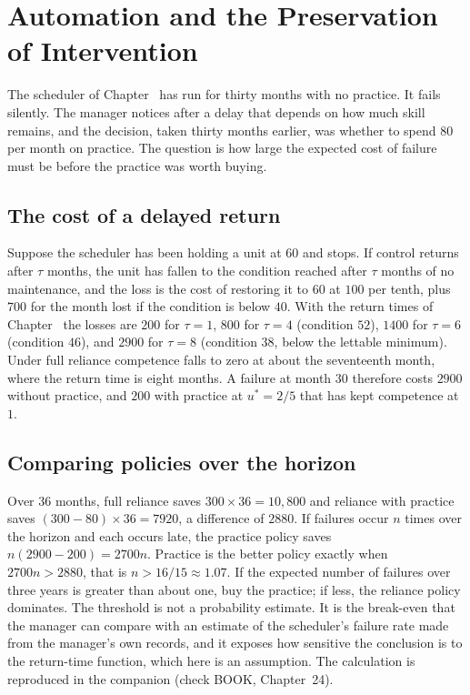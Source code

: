\chapter{Automation and the Preservation of Intervention}\label{ch:24}

The scheduler of Chapter~ has run for thirty months with no practice. It fails silently. The manager notices after a delay that depends on how much skill remains, and the decision, taken thirty months earlier, was whether to spend $80$ per month on practice. The question is how large the expected cost of failure must be before the practice was worth buying.

\section{The cost of a delayed return}

Suppose the scheduler has been holding a unit at $60$ and stops. If control returns after $\tau$ months, the unit has fallen to the condition reached after $\tau$ months of no maintenance, and the loss is the cost of restoring it to $60$ at $100$ per tenth, plus $700$ for the month lost if the condition is below $40$. With the return times of Chapter~ the losses are $200$ for $\tau=1$, $800$ for $\tau=4$ (condition $52$), $1400$ for $\tau=6$ (condition $46$), and $2900$ for $\tau=8$ (condition $38$, below the lettable minimum). Under full reliance competence falls to zero at about the seventeenth month, where the return time is eight months. A failure at month $30$ therefore costs $2900$ without practice, and $200$ with practice at $u^*=2/5$ that has kept competence at $1$.

\section{Comparing policies over the horizon}

Over $36$ months, full reliance saves $300\times 36=10{,}800$ and reliance with practice saves $(300-80)\times 36=7920$, a difference of $2880$. If failures occur $n$ times over the horizon and each occurs late, the practice policy saves $n(2900-200)=2700n$. Practice is the better policy exactly when $2700n>2880$, that is $n>16/15\approx 1.07$. If the expected number of failures over three years is greater than about one, buy the practice; if less, the reliance policy dominates. The threshold is not a probability estimate. It is the break-even that the manager can compare with an estimate of the scheduler's failure rate made from the manager's own records, and it exposes how sensitive the conclusion is to the return-time function, which here is an assumption. The calculation is reproduced in the companion (check BOOK, Chapter~24).

